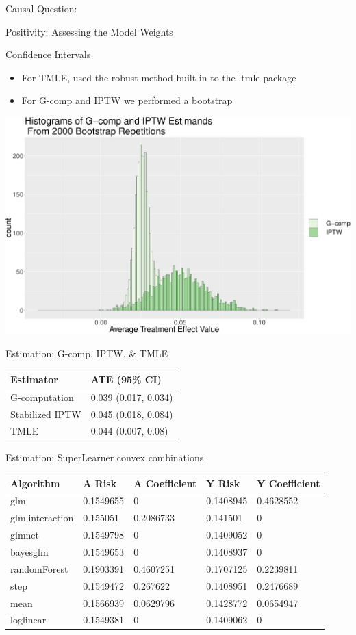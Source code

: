 \documentclass[ignorenonframetext,]{beamer}
\begin{document}
\begin{frame}{Causal Question:}
\begin{block}{Positivity: Assessing the Model Weights}
\end{block}

\begin{block}{Confidence Intervals}

\begin{itemize}
\item
  For TMLE, used the robust method built in to the ltmle package
\item
  For G-comp and IPTW we performed a bootstrap
\end{itemize}

\includegraphics{Final_Project_Coding_files/figure-beamer/unnamed-chunk-4-1.pdf}

\end{block}

\begin{block}{Estimation: G-comp, IPTW, \& TMLE}

\begin{longtable}[]{@{}ll@{}}
\toprule
Estimator & ATE (95\% CI)\tabularnewline
\midrule
\endhead
G-computation & 0.039 (0.017, 0.034)\tabularnewline
Stabilized IPTW & 0.045 (0.018, 0.084)\tabularnewline
TMLE & 0.044 (0.007, 0.08)\tabularnewline
\bottomrule
\end{longtable}

\end{block}

\begin{block}{Estimation: SuperLearner convex combinations}

\begin{longtable}[]{@{}lllll@{}}
\toprule
Algorithm & A Risk & A Coefficient & Y Risk & Y
Coefficient\tabularnewline
\midrule
\endhead
glm & 0.1549655 & 0 & 0.1408945 & 0.4628552\tabularnewline
glm.interaction & 0.155051 & 0.2086733 & 0.141501 & 0\tabularnewline
glmnet & 0.1549798 & 0 & 0.1409052 & 0\tabularnewline
bayesglm & 0.1549653 & 0 & 0.1408937 & 0\tabularnewline
randomForest & 0.1903391 & 0.4607251 & 0.1707125 &
0.2239811\tabularnewline
step & 0.1549472 & 0.267622 & 0.1408951 & 0.2476689\tabularnewline
mean & 0.1566939 & 0.0629796 & 0.1428772 & 0.0654947\tabularnewline
loglinear & 0.1549381 & 0 & 0.1409062 & 0\tabularnewline
\bottomrule
\end{longtable}


\end{block}
\end{frame}
\end{document}
